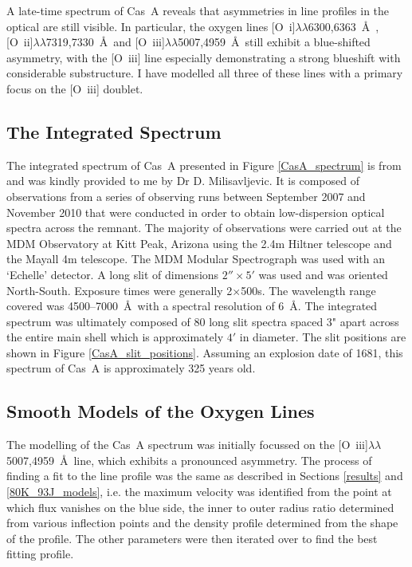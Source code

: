 A late-time spectrum of Cas~A reveals that asymmetries in line profiles in the optical are still visible.  In particular, the oxygen lines [O~{\sc i}]$\lambda\lambda$6300,6363~\AA\ , [O~{\sc ii}]$\lambda\lambda$7319,7330~\AA\  and [O~{\sc iii}]$\lambda\lambda$5007,4959~\AA\  still exhibit a blue-shifted asymmetry, with the [O~{\sc iii}] line especially demonstrating a strong blueshift with considerable substructure.  I have modelled all three of these lines with a primary focus on the [O~{\sc iii}] doublet.

\subsection{The Integrated Spectrum}

The integrated spectrum of Cas~A presented in Figure \ref{CasA_spectrum} is from \citet{Milisavljevic2013} and was kindly provided to me by Dr D. Milisavljevic.  It is composed of observations from a series of observing runs between September 2007 and November 2010 that were conducted in order to obtain low-dispersion optical spectra across the remnant.  The majority of observations were carried out at the MDM Observatory at Kitt Peak, Arizona using the 2.4m Hiltner telescope and the Mayall 4m telescope.  The MDM Modular Spectrograph was used with an `Echelle' detector.  A long slit of dimensions $2''\times5'$ was used and was oriented North-South.  Exposure times were generally 2$\times$500s.  The wavelength range covered was 4500--7000~\AA\  with a spectral resolution of 6~\AA.  
The integrated spectrum was ultimately composed of 80 long slit spectra spaced 3" apart across the entire main shell which is approximately $4'$ in diameter.  The slit positions are shown in Figure \ref{CasA_slit_positions}.  Assuming an explosion date of 1681, this spectrum of Cas~A is approximately 325 years old.


\subsection{Smooth Models of the Oxygen Lines}
\label{scn:CasA_smooth}
The modelling of the Cas~A spectrum was initially focussed on the [O~{\sc iii}]$\lambda\lambda$5007,4959~\AA\  line, which exhibits a pronounced asymmetry.  The process of finding a fit to the line profile was the same as described in Sections \ref{results} and \ref{80K_93J_models}, i.e. the maximum velocity was identified from the point at which flux vanishes on the blue side, the inner to outer radius ratio determined from various inflection points and the density profile determined from the shape of the profile.  The other parameters were then iterated over to find the best fitting profile.  

